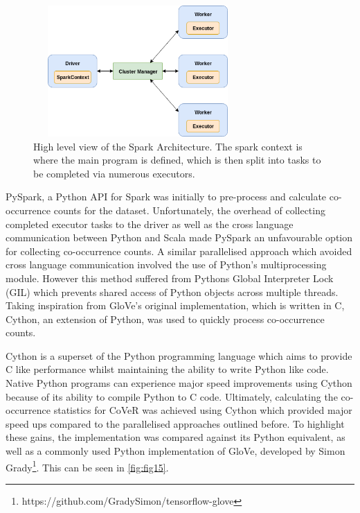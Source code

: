 \begin{figure}[h]
	\includegraphics[width=8cm, height=5cm]{./figures/fig19}
	\centering
	\caption{High level view of the Spark Architecture. The spark context is where the main program is defined, which is then split into tasks to be completed via numerous executors.}
	\label{fig:fig19}
\end{figure}

\noindent
\newline
PySpark, a Python API for Spark was initially to pre-process and calculate co-occurrence counts for the dataset. 
Unfortunately, the overhead of collecting completed executor tasks to the driver as well as the cross language communication between Python and Scala made PySpark an unfavourable option for collecting co-occurrence counts. A similar parallelised approach which avoided cross language communication involved the use of Python's multiprocessing module. However this method suffered from Pythons Global Interpreter Lock (GIL) which prevents shared access of Python objects across multiple threads. Taking inspiration from GloVe's original implementation, which is written in C, Cython, an extension of Python, was used to quickly process co-occurrence counts.

\noindent
\newline
Cython is a superset of the Python programming language which aims to provide C like performance whilst maintaining the ability to write Python like code. Native Python programs can experience major speed improvements using Cython because of its ability to compile Python to C code. Ultimately, calculating the co-occurrence statistics for CoVeR was achieved using Cython which provided major speed ups compared to the parallelised approaches outlined before. To highlight these gains, the implementation was compared against its Python equivalent, as well as a commonly used Python implementation of GloVe, developed by Simon Grady\footnote{https://github.com/GradySimon/tensorflow-glove}. This can be seen in \autoref{fig:fig15}.

